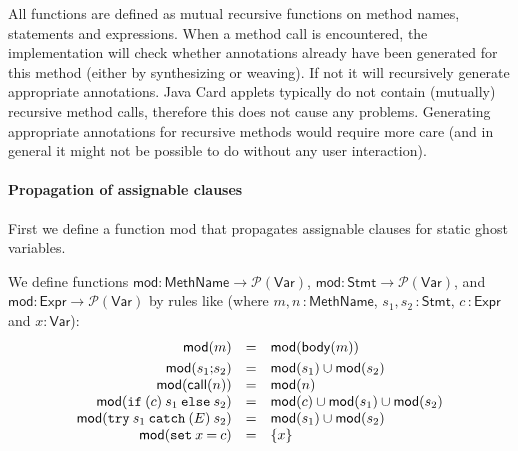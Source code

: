 All functions are defined as mutual recursive functions on method
names, statements and expressions. When a method call is encountered,
the implementation will check whether annotations already have been
generated for this method (either by synthesizing or weaving). If not
it will recursively generate appropriate annotations. Java Card
applets typically do not contain (mutually) recursive method calls,
therefore this does not cause any problems. Generating appropriate
annotations for recursive methods would require more care (and in
general it might not be possible to do without any user interaction).


\paragraph{Propagation of assignable clauses}
First we define a function \textsf{mod} that propagates
assignable clauses for static ghost variables.

\begin{definition}We define functions
\(\mathsf{mod} \colon \mathsf{MethName} \rightarrow
\mathcal{P}(\mathsf{Var})\), 
\(
\mathsf{mod}  \colon  \mathsf{Stmt}   \rightarrow
\mathcal{P}(\mathsf{Var}) \), and 
\(\mathsf{mod}  \colon  \mathsf{Expr}   \rightarrow  \mathcal{P}(\mathsf{Var})\)
by rules like (where \(m,n\,\colon\mathsf{MethName}\),
\(s_1,s_2\,\colon\mathsf{Stmt}\), \(c\,\colon\mathsf{Expr}\) and \(x\colon\mathsf{Var}\)):
\[
\begin{array}{rcl}
\mathsf{mod}(m) & = & \mathsf{mod}(\mathsf{body}(m)) \smallskip \\
\mathsf{mod}(s_1 \mathtt{;} s_2) & = & \mathsf{mod}(s_1) \cup \mathsf{mod}(s_2)\\
\mathsf{mod}(\mathsf{call}(n)) & = &  \mathsf{mod}(n) \\
\mathsf{mod}(\mathtt{if\:(} c \mathtt{)\:} s_1 \mathtt{\:else\:} s_2)
&=& \mathsf{mod}(c) \cup \mathsf{mod}(s_1) \cup \mathsf{mod}(s_2)\\
\mathsf{mod}(\mathtt{try\:} s_1 \mathtt{\:catch\:(} E \mathtt{)\:}
s_2) & = & \mathsf{mod}(s_1) \cup \mathsf{mod}(s_2)\\
\mathsf{mod}(\mathtt{set\:}x \mathtt{\:=\:} c) & = &  \{ x \} 
\end{array}
\]
\end{definition}


